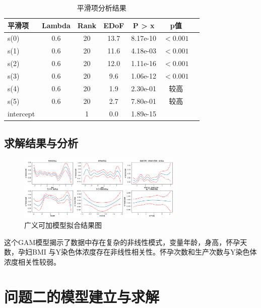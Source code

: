 \documentclass[withoutpreface,notoc]{cumcmthesis}
\begin{document}
	\begin{table}[H]
	\centering
	\caption{平滑项分析结果}
	\label{tab:smooth_terms}
		\begin{tabular}{lcccccc}
		\toprule
		平滑项 & Lambda & Rank & EDoF & P > x & p值 \\
		\midrule
		s(0) & 0.6 & 20 & 13.7 & 8.17e-10 & $<0.001$ \\
		s(1) & 0.6 & 20 & 11.6 & 4.18e-03 & $<0.001$ \\
		s(2) & 0.6 & 20 & 12.0 & 1.11e-16 & $<0.001$ \\
		s(3) & 0.6 & 20 & 9.6 & 1.06e-12 & $<0.001$ \\
		s(4) & 0.6 & 20 & 1.9 & 2.30e-01 & 较高 \\
		s(5) & 0.6 & 20 & 2.7 & 7.80e-01 & 较高 \\
		intercept & & 1 & 0.0 & 1.89e-15 &      \\
		\bottomrule
		\end{tabular}
	\end{table}





	
	
	

	
	\subsection{求解结果与分析}
	
	\begin{figure}[ht]
		\centering
		\includegraphics[width=0.7\textwidth]{figures/广义可加结果.png} 
		\caption{广义可加模型拟合结果图}
		\label{广义可加结果}
	\end{figure}

		这个GAM模型揭示了数据中存在复杂的非线性模式，变量年龄，身高，怀孕天数，孕妇BMI
	与Y染色体浓度存在非线性相关性。怀孕次数和生产次数与Y染色体浓度相关性较弱。
	
	\section{问题二的模型建立与求解}
\end{document}
